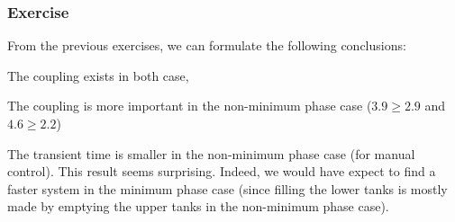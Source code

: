 \subsubsection{Exercise}

From the previous exercises, we can formulate the following conclusions:
\begin{shortitemize}
\item The coupling exists in both case,
\item The coupling is more important in the non-minimum phase case ($3.9 \geq 2.9$ and $4.6 \geq 2.2$)
\item The transient time is smaller in the non-minimum phase case (for manual control). This result seems surprising. Indeed, we would have expect to find a faster system in the minimum phase case (since filling the lower tanks is mostly made by emptying the upper tanks in the non-minimum phase case).
\end{shortitemize}
